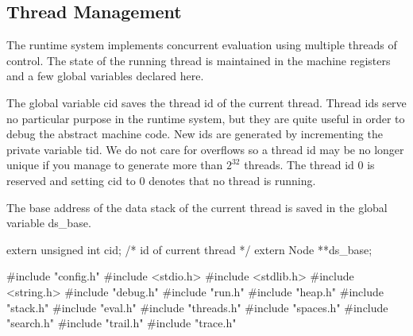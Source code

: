 %
%
\subsection{Thread Management}
The runtime system implements concurrent evaluation using multiple
threads of control. The state of the running thread is maintained in
the machine registers and a few global variables declared here.

The global variable {\Tt{}cid\nwendquote} saves the thread id of the current thread.
Thread ids serve no particular purpose in the runtime system, but
they are quite useful in order to debug the abstract machine code. New
ids are generated by incrementing the private variable {\Tt{}tid\nwendquote}. We do
not care for overflows so a thread id may be no longer unique if you
manage to generate more than $2^{32}$ threads. The thread id {\Tt{}0\nwendquote} is
reserved and setting {\Tt{}cid\nwendquote} to {\Tt{}0\nwendquote} denotes that no thread is
running.

The base address of the data stack of the current thread is saved in
the global variable {\Tt{}ds{\_}base\nwendquote}.

\nwenddocs{}\endmoddef\nwstartdeflinemarkup{}\nwenddeflinemarkup
extern unsigned int cid;        /* id of current thread */
extern Node     **ds_base;

\nwendcode{}\nwdocspar
\nwenddocs{}\endmoddef\nwstartdeflinemarkup{}\nwenddeflinemarkup
#include "config.h"
#include <stdio.h>
#include <stdlib.h>
#include <string.h>
#include "debug.h"
#include "run.h"
#include "heap.h"
#include "stack.h"
#include "eval.h"
#include "threads.h"
#include "spaces.h"
#include "search.h"
#include "trail.h"
#include "trace.h"

